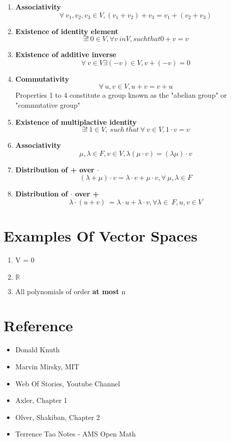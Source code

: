 \documentclass{report}
\begin{document}
\begin{enumerate}
    \item \textbf{Associativity}\\
    \[\forall \ v_1, v_2,v_3 \in V, (v_1 + v_2) + v_3 = v_1 + (v_2 + v_3)\]
    \item \textbf{Existence of identity element}\\
    \[\exists! \ 0 \in V, \forall v\ in V, such that 0 + v = v\]
    \item \textbf{Existence of additive inverse}
    \[\forall \ v \in V \exists (-v) \in V, v + (-v) = 0\]
    \item \textbf{Commutativity}
    \[\forall \ u, v \in V, u+v = v+u \]
        Properties 1 to 4 constitute a group known as the "abelian group" or "commutative group"
    \item \textbf{Existence of multiplactive identity}
    \[\exists! \ 1 \in V, \ such \ that \ \forall \ v \in V, 1\cdot v = v\]
    \item \textbf{Associativity}
    \[\mu, \lambda \in F, v \in V, \lambda(\mu \cdot v) = (\lambda\mu)\cdot v\]
    \item \textbf{Distribution of + over $\cdot$}
    \[(\lambda + \mu) \cdot v = \lambda \cdot v + \mu \cdot v, \forall \ \mu, \lambda \in F\]
    \item \textbf{Distribution of $\cdot$ over +}
    \[\lambda \cdot(u + v)\ = \lambda \cdot u + \lambda \cdot v, \forall \lambda \in \ F, u,v \in V\]    
\end{enumerate}
\section{Examples Of Vector Spaces}
\begin{enumerate}
    \item V = {0}
    \item $\mathbb{R}$
    \item All polynomials of order \textbf{at most} n
\end{enumerate}
\section*{Reference}
    \begin{itemize}
        \item Donald Knuth
        \item Marvin Mirsky, MIT
        \item Web Of Stories, Youtube Channel
        \item Axler, Chapter 1
        \item Olver, Shakiban, Chapter 2
        \item Terrence Tao Notes - AMS Open Math
    \end{itemize}
\end{document}
